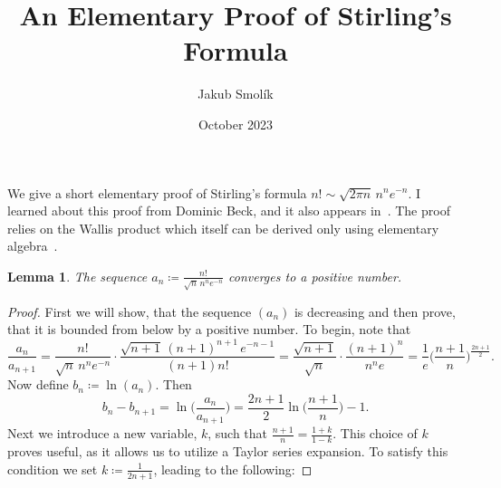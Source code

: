 \documentclass[11pt]{amsart}
\title{An Elementary Proof of Stirling's Formula}
\author{Jakub Smolík}
\date{October 2023}
\theoremstyle{plain}
\newtheorem{lemma}[theorem]{Lemma}
\theoremstyle{definition}
\theoremstyle{remark}
\begin{document}
\maketitle


We give a short elementary proof of Stirling's formula $n! \sim \sqrt{2\pi n}\,n^n e^{-n}$. I learned about this proof from Dominic Beck, and it also appears in~\cite{little2015real}. The proof relies on the Wallis product which itself can be derived only using elementary algebra~\cite{wastlund2007elementary}.

\begin{lemma}
    The sequence $\displaystyle a_n \coloneqq \frac{n!}{\sqrt{n}\,n^ne^{-n}}$ 
    converges to a positive number.
\end{lemma}
\begin{proof}
    First we will show, that the sequence $(a_n)$ is decreasing and then prove, that it is bounded from below by a positive number. To begin, note that
    \[
        \frac{a_n}{a_{n+1}} = \frac{n!}{\sqrt{n}\,n^ne^{-n}} \cdot \frac{\sqrt{n+1}\,(n+1)^{n+1}\,e^{-n-1}}{(n+1)n!} =
        \frac{\sqrt{n+1}}{\sqrt{n}} \cdot \frac{(n+1)^n}{n^n e} =
        \frac{1}{e} \biggl(\frac{n+1}{n} \biggr)^\frac{2n+1}{2}.
    \]
    Now define $b_n \coloneqq \ln(a_n)$. Then
    \[
        b_n - b_{n+1} = \ln\biggl( \frac{a_n}{a_{n+1}} \biggr) = 
        \frac{2n+1}{2} \ln\biggl( \frac{n+1}{n} \biggr) - 1.
    \]
    Next we introduce a new variable, $k$, such that $\frac{n+1}{n} = \frac{1+k}{1-k}$. This choice of $k$ proves useful, as it allows us to utilize a Taylor series expansion. To satisfy this condition we set $k \coloneqq \frac{1}{2n+1}$, leading to the following:


\end{proof}
\end{document}
